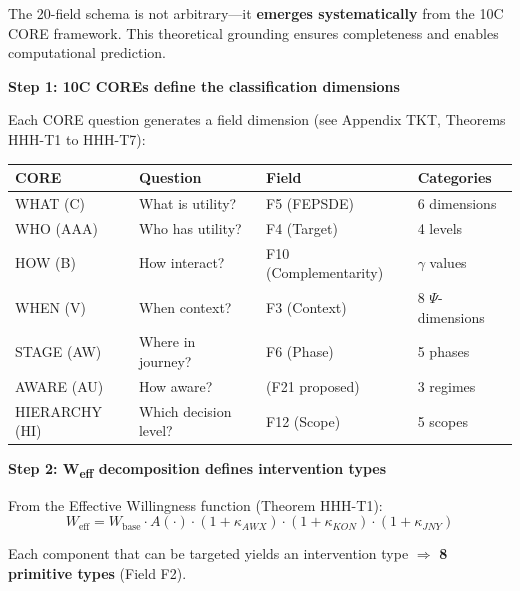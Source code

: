 The 20-field schema is not arbitrary---it \textbf{emerges systematically} from the 10C CORE framework. This theoretical grounding ensures completeness and enables computational prediction.

\begin{tcolorbox}[colback=blue!5!white, colframe=blue!75!black,
    title=\textbf{The Emergence Architecture}]

\textbf{Step 1: 10C COREs define the classification dimensions}

Each CORE question generates a field dimension (see Appendix TKT, Theorems HHH-T1 to HHH-T7):

\begin{center}
\renewcommand{\arraystretch}{1.2}
\begin{tabular}{@{}llll@{}}
\toprule
\textbf{CORE} & \textbf{Question} & \textbf{Field} & \textbf{Categories} \\
\midrule
WHAT (C) & What is utility? & F5 (FEPSDE) & 6 dimensions \\
WHO (AAA) & Who has utility? & F4 (Target) & 4 levels \\
HOW (B) & How interact? & F10 (Complementarity) & $\gamma$ values \\
WHEN (V) & When context? & F3 (Context) & 8 $\Psi$-dimensions \\
STAGE (AW) & Where in journey? & F6 (Phase) & 5 phases \\
AWARE (AU) & How aware? & (F21 proposed) & 3 regimes \\
HIERARCHY (HI) & Which decision level? & F12 (Scope) & 5 scopes \\
\bottomrule
\end{tabular}
\end{center}

\textbf{Step 2: W\textsubscript{eff} decomposition defines intervention types}

From the Effective Willingness function (Theorem HHH-T1):
\begin{equation}
W_{\text{eff}} = W_{\text{base}} \cdot A(\cdot) \cdot (1 + \kappa_{AWX}) \cdot (1 + \kappa_{KON}) \cdot (1 + \kappa_{JNY})
\end{equation}

Each component that can be targeted yields an intervention type $\Rightarrow$ \textbf{8 primitive types} (Field F2).

\end{tcolorbox}

